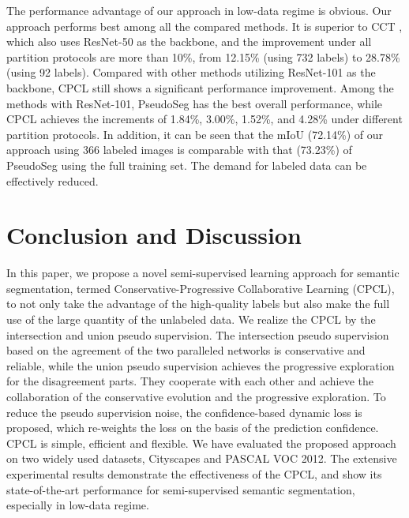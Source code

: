 \documentclass[journal]{IEEEtran}
\begin{document}
The performance advantage of our approach in low-data regime is obvious. Our approach performs best among all the compared methods. It is superior to CCT \cite{CCT}, which 
also uses ResNet-50 as the backbone, and the improvement under all partition protocols are more than 10\%, from 12.15\% (using 732 labels) to 28.78\% (using 92 labels). Compared 
with other methods utilizing ResNet-101 as the backbone, CPCL still shows a significant performance improvement. Among the methods with ResNet-101, PseudoSeg \cite{pseudoseg} 
has the best overall performance, while CPCL achieves the increments of 1.84\%, 3.00\%, 1.52\%, and 4.28\% under different partition protocols. In addition, it can be seen 
that the mIoU (72.14\%) of our approach using 366 labeled images is comparable with that (73.23\%) of PseudoSeg using the full training set. The demand for labeled data can be 
effectively reduced.

\section{Conclusion and Discussion}

In this paper, we propose a novel semi-supervised learning approach for semantic segmentation, termed Conservative-Progressive Collaborative Learning (CPCL), to not only take the 
advantage of the high-quality labels but also make the full use of the large quantity of the unlabeled data. We realize the CPCL by the intersection and union pseudo supervision. 
The intersection pseudo supervision based on the agreement of the two paralleled networks is conservative and reliable, while the union pseudo supervision achieves the progressive 
exploration for the disagreement parts. They cooperate with each other and achieve the collaboration of the conservative evolution and the progressive exploration. To reduce the 
pseudo supervision noise, the confidence-based dynamic loss is proposed, which re-weights the loss on the basis of the prediction confidence. CPCL is simple, efficient and flexible. 
We have evaluated the proposed approach on two widely used datasets, Cityscapes and PASCAL VOC 2012. The extensive experimental results demonstrate the effectiveness of the 
CPCL, and show its state-of-the-art performance for semi-supervised semantic segmentation, especially in low-data regime. 
\end{document}
